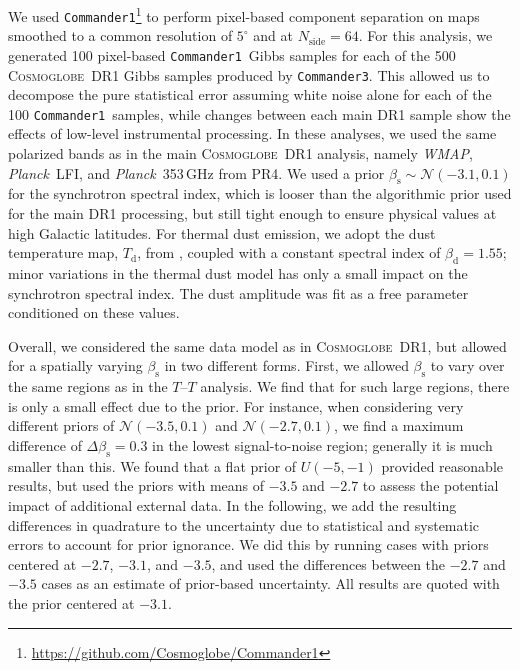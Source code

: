 \documentclass[twocolumn]{../../common/aa}
\def\WMAP{\emph{WMAP}}
\def\Planck{\emph{Planck}}
\def\commanderone{\texttt{Commander1}}
\def\commanderthree{\texttt{Commander3}}
\newcommand{\cosmoglobe}{\textsc{Cosmoglobe}}
\begin{document}
We used \commanderone\footnote{\url{https://github.com/Cosmoglobe/Commander1}} to perform pixel-based component separation on maps smoothed to a common resolution of $5^\circ$ and at $N_\mathrm{side}=64$.
For this analysis, we generated 100 pixel-based \commanderone\ Gibbs samples for each of the 500 \cosmoglobe\ DR1 Gibbs samples produced by \commanderthree. This allowed us to decompose the pure statistical error assuming white noise alone for each of the 100 \commanderone\ samples, while changes between each main DR1 sample show the effects of low-level instrumental processing. In these analyses, we used the same polarized bands as in the main \cosmoglobe\ DR1 analysis, namely \WMAP, \Planck\ LFI, and \Planck\ 353\,GHz from PR4. We used a prior $\beta_\mathrm s\sim\mathcal N(-3.1, 0.1)$ for the synchrotron spectral index, which is looser than the algorithmic prior used for the main DR1 processing, but still tight enough to ensure physical values at high Galactic latitudes. For thermal dust emission, we adopt the dust temperature map, $T_\mathrm d$, from \citet{planck2014-a12}, coupled with a constant spectral index of $\beta_\mathrm d=1.55$; minor variations in the thermal dust model has only a small impact on the synchrotron spectral index. The dust amplitude was fit as a free parameter conditioned on these values.

Overall, we considered the same data model as in \cosmoglobe\ DR1, but allowed for a spatially varying $\beta_\mathrm s$ in two different forms.
First, we allowed $\beta_\mathrm s$ to vary over the same regions as in the $T$--$T$ analysis.
We find that for such large regions, there is only a small effect due to the prior. For instance, when considering very different priors of $\mathcal N(-3.5,0.1)$ and $\mathcal N(-2.7, 0.1)$, we find a maximum difference of $\Delta\beta_{\mathrm{s}}=0.3$ in the lowest signal-to-noise region; generally it is much smaller than this. 
We found that a flat prior of  $U(-5,-1)$ provided reasonable results, but used the priors with means of $-3.5$ and $-2.7$ to assess the potential impact of additional external data.
In the following, we add the resulting differences in quadrature to the uncertainty due to statistical and systematic errors to account for prior ignorance. We did this by running cases with priors centered at $-2.7$, $-3.1$, and $-3.5$, and used the differences between the $-2.7$ and $-3.5$ cases as an estimate of prior-based uncertainty. All results are quoted with the prior centered at $-3.1$.
\end{document}
